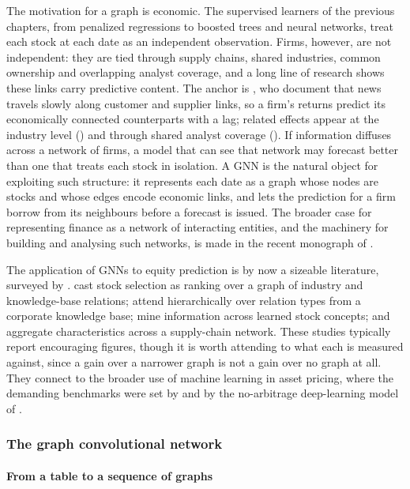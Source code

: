 The motivation for a graph is economic. The supervised learners of the previous chapters, from penalized regressions to boosted trees and neural networks, treat each stock at each date as an independent observation. Firms, however, are not independent: they are tied through supply chains, shared industries, common ownership and overlapping analyst coverage, and a long line of research shows these links carry predictive content. The anchor is \cite{cohen2008economic}, who document that news travels slowly along customer and supplier links, so a firm's returns predict its economically connected counterparts with a lag; related effects appear at the industry level (\cite{menzly2010market}) and through shared analyst coverage (\cite{ali2020shared}). If information diffuses across a network of firms, a model that can see that network may forecast better than one that treats each stock in isolation. A GNN is the natural object for exploiting such structure: it represents each date as a graph whose nodes are stocks and whose edges encode economic links, and lets the prediction for a firm borrow from its neighbours before a forecast is issued. The broader case for representing finance as a network of interacting entities, and the machinery for building and analysing such networks, is made in the recent monograph of \cite{konstantinov2025network}.

The application of GNNs to equity prediction is by now a sizeable literature, surveyed by \cite{patel2024systematic}. \cite{feng2019temporal} cast stock selection as ranking over a graph of industry and knowledge-base relations; \cite{kim2019hats} attend hierarchically over relation types from a corporate knowledge base; \cite{xu2021hist} mine information across learned stock concepts; and \cite{capponi2025graph} aggregate characteristics across a supply-chain network. These studies typically report encouraging figures, though it is worth attending to what each is measured against, since a gain over a narrower graph is not a gain over no graph at all. They connect to the broader use of machine learning in asset pricing, where the demanding benchmarks were set by \cite{gu2020empirical} and by the no-arbitrage deep-learning model of \cite{chen2024deep}.

\subsubsection{The graph convolutional network}\label{sec_gnn_gcn}

\paragraph{From a table to a sequence of graphs}\label{sec_gnn_graphs}

